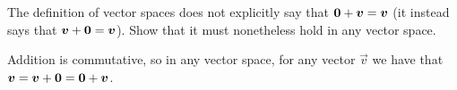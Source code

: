 
\begin{Exercise}[
name={},
title={}, 
difficulty=0,
origin={\cite{JH}}]
The definition of vector spaces does not explicitly say that
\( \bm{0}+\bm{v}=\bm{v} \)
(it instead says that \( \bm{v}+\bm{0}=\bm{v} \)).
Show that it must nonetheless hold in any vector space.

\end{Exercise}

\begin{Answer}

Addition is commutative, so in any vector space,
for any vector \( \vec{v} \) we have that
\( \bm{v}=\bm{v}+\bm{0}=\bm{0}+\bm{v} \).

\end{Answer}
